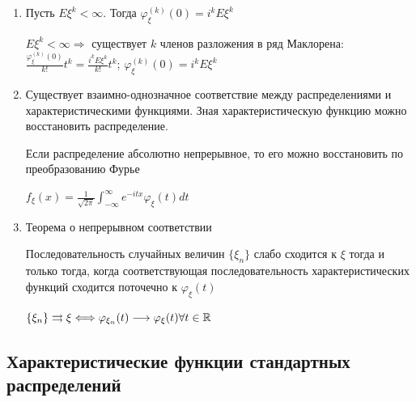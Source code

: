 \documentclass[12pt]{article}
\begin{document}
\begin{enumerate}
    \item Пусть $E\xi^k < \infty$. Тогда $\varphi_\xi^{(k)}(0) = i^k E\xi^k$

    \begin{MyProof}
        $E\xi^k < \infty \Longrightarrow$ существует $k$ членов разложения в ряд Маклорена: 
        $\frac{\varphi_\xi^{(k)}(0)}{k!}t^k = \frac{i^k E\xi^k}{k!} t^k$; $\varphi_\xi^{(k)}(0) = i^k E\xi^k$
    \end{MyProof}

    \item Существует взаимно-однозначное соответствие между распределениями и характеристическими функциями.
    Зная характеристическую функцию можно восстановить распределение.

    \Ex Если распределение абсолютно непрерывное, то его можно восстановить по преобразованию Фурье

    $f_\xi(x) = \frac{1}{\sqrt{2\pi}} \int_{-\infty}^{\infty} e^{-itx} \varphi_\xi(t) dt$

    \item Теорема о непрерывном соответствии
    
    \begin{MyTheorem}
        \Ths Последовательность случайных величин $\{\xi_n\}$ слабо сходится к $\xi$ тогда и только тогда, когда
        соответствующая последовательность характеристических функций сходится поточечно к $\varphi_\xi(t)$

        $\{\xi_n\} \rightrightarrows \xi \Longleftrightarrow \varphi_{\xi_n}(t) \longrightarrow \varphi_\xi(t) \forall t \in \mathbb{R}$
    \end{MyTheorem}

\end{enumerate}

\subsection{Характеристические функции стандартных распределений}

\hypertarget{characteristicfunctionofstandarddistributions}{}
\end{document}
